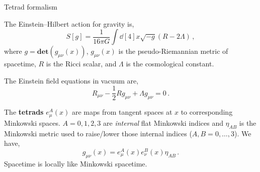 \documentclass[12pt,titlepage]{article}
\begin{document}
\begin{frame}{Tetrad formalism}
    \begin{list}{\,}{\leftmargin=1em \itemindent=0em}
        \item<1-> The Einstein–Hilbert action for gravity is,
        \begin{equation}
            S[g]=\frac{1}{16\pi G}\int\dd[4]{x}\sqrt{-g}(R-2\Lambda)\,,
        \end{equation}
        where $g=\mathbf{det}(g_{\mu\nu}(x))$, $g_{\mu\nu}(x)$ is the pseudo-Riemannian metric of spacetime, $R$ is the Ricci scalar, and $\Lambda$ is the cosmological constant.
        \item<2-> The Einstein field equations in vacuum are,
        \begin{equation}
            R_{\mu\nu}-\frac{1}{2}Rg_{\mu\nu}+\Lambda g_{\mu\nu}=0\,.
        \end{equation}
        \item<3-> The \textbf{tetrads} $e_\mu^A(x)$ are maps from tangent spaces at $x$ to corresponding Minkowski spaces. $A=0,1,2,3$ are \textit{internal} flat Minkowski indices and $\eta_{AB}$ is the Minkowski metric used to raise/lower those internal indices ($A,B=0, \dots, 3$). We have,
        \begin{equation}
            g_{\mu\nu}(x)=e_\mu^A(x)e_\nu^B(x)\eta_{AB}\,.
        \end{equation}
        Spacetime is locally like Minkowski spacetime.
    \end{list}
\end{frame}
\end{document}
